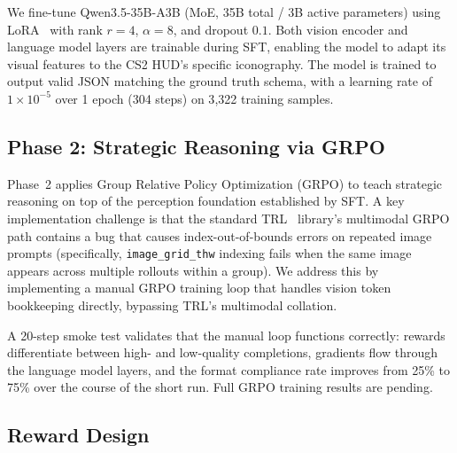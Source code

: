 \documentclass{article}
\begin{document}
We fine-tune Qwen3.5-35B-A3B (MoE, 35B total / 3B active parameters) using LoRA~\cite{hu2022lora} with rank $r{=}4$, $\alpha{=}8$, and dropout $0.1$. Both vision encoder and language model layers are trainable during SFT, enabling the model to adapt its visual features to the CS2 HUD's specific iconography. The model is trained to output valid JSON matching the ground truth schema, with a learning rate of $1 \times 10^{-5}$ over 1 epoch (304 steps) on 3{,}322 training samples.

\subsection{Phase 2: Strategic Reasoning via GRPO}
\label{sec:grpo}


Phase~2 applies Group Relative Policy Optimization (GRPO) to teach strategic reasoning on top of the perception foundation established by SFT. A key implementation challenge is that the standard TRL~\cite{vonwerra2023trl} library's multimodal GRPO path contains a bug that causes index-out-of-bounds errors on repeated image prompts (specifically, \texttt{image\_grid\_thw} indexing fails when the same image appears across multiple rollouts within a group). We address this by implementing a manual GRPO training loop that handles vision token bookkeeping directly, bypassing TRL's multimodal collation.

A 20-step smoke test validates that the manual loop functions correctly: rewards differentiate between high- and low-quality completions, gradients flow through the language model layers, and the format compliance rate improves from 25\% to 75\% over the course of the short run. Full GRPO training results are pending.

\subsection{Reward Design}
\label{sec:reward}
\end{document}
